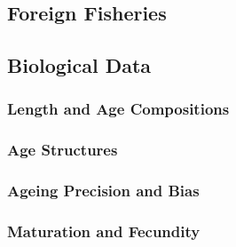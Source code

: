 \documentclass[11pt,
  english,
  a4paper,
]{article}
\begin{document}
\hypertarget{foreign-fisheries-1}{%
\subsection{Foreign Fisheries}\label{foreign-fisheries-1}}

\leavevmode\tagmcend\tagstructend


\hypertarget{biological-data-1}{%
\subsection{Biological Data}\label{biological-data-1}}

\leavevmode\tagmcend\tagstructend


\hypertarget{length-and-age-compositions-1}{%
\subsubsection{Length and Age Compositions}\label{length-and-age-compositions-1}}

\leavevmode\tagmcend\tagstructend


\hypertarget{age-structures-1}{%
\subsubsection{Age Structures}\label{age-structures-1}}

\leavevmode\tagmcend\tagstructend


\hypertarget{ageing-precision-and-bias-1}{%
\subsubsection{Ageing Precision and Bias}\label{ageing-precision-and-bias-1}}

\leavevmode\tagmcend\tagstructend


\hypertarget{maturation-and-fecundity-1}{%
\subsubsection{Maturation and Fecundity}\label{maturation-and-fecundity-1}}
\end{document}
